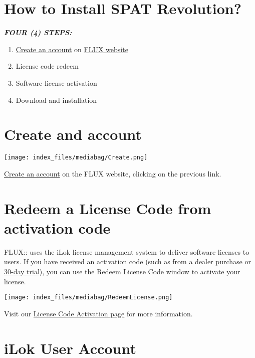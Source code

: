\documentclass[
  letterpaper,
  DIV=11,
  numbers=noendperiod]{scrreport}
\providecommand{\tightlist}{%
  \setlength{\itemsep}{0pt}\setlength{\parskip}{0pt}}\usepackage{longtable,booktabs,array}
\begin{document}
\hypertarget{how-to-install-spat-revolution}{%
\section{How to Install SPAT
Revolution?}\label{how-to-install-spat-revolution}}

\textbf{\emph{FOUR (4) STEPS:}}

\begin{enumerate}
\def\labelenumi{\arabic{enumi}.}
\tightlist
\item
  \href{https://shop.flux.audio/en_US/login}{Create an account} on
  \href{flux.audio}{FLUX website}
\item
  License code redeem
\item
  Software license activation
\item
  Download and installation
\end{enumerate}

\hypertarget{create-and-account}{%
\section{Create and account}\label{create-and-account}}

\texttt{[image: index\_files/mediabag/Create.png]}

\href{https://shop.flux.audio/en_US/login}{Create an account} on the
FLUX website, clicking on the previous link.

\hypertarget{redeem-a-license-code-from-activation-code}{%
\section{Redeem a License Code from activation
code}\label{redeem-a-license-code-from-activation-code}}

FLUX:: uses the iLok license management system to deliver software
licenses to users. If you have received an activation code (such as from
a dealer purchase or
\href{https://shop.flux.audio/en_US/page/trial-request-information}{30-day
trial}), you can use the Redeem License Code window to activate your
license.

\texttt{[image: index\_files/mediabag/RedeemLicense.png]}

Visit our
\href{https://shop.flux.audio/en_US/account/licence_code_redeem}{License
Code Activation page} for more information.

\hypertarget{ilok-user-account}{%
\section{iLok User Account}\label{ilok-user-account}}
\end{document}
